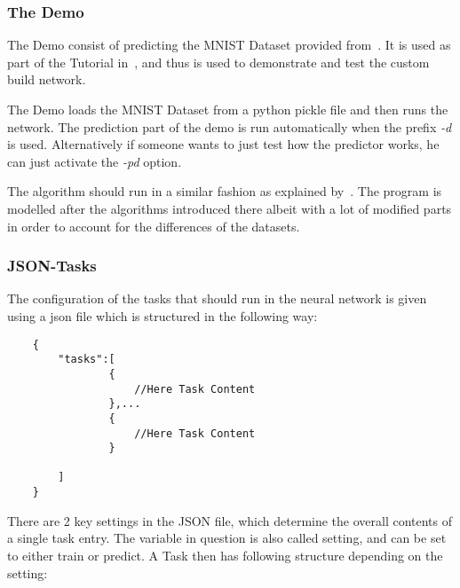 \documentclass[12pt]{article}
\begin{document}

\subsubsection{The Demo}
\label{subsub:demo}
The Demo consist of predicting the MNIST Dataset provided from~\cite{MNISTSite}. It is used as part of the Tutorial in~\cite{deepLearning.org}, and thus is used to demonstrate and test the custom build network. 

The Demo loads the MNIST Dataset from a python pickle file and then runs the network. The prediction part of the demo is run automatically when the prefix \emph{-d} is used. Alternatively if someone wants to just test how the predictor works, he can just activate the \emph{-pd} option.

The algorithm should run in a similar fashion as explained by~\cite{theanoTutorial}. The program is modelled after the algorithms introduced there albeit with a lot of modified parts in order to account for the differences of the datasets.

\subsubsection{JSON-Tasks}
\label{subsub:json}

The configuration of the tasks that should run in the neural network is given using a json file which is structured in the following way:
\begin{verbatim}
    {
        "tasks":[
                {
                    //Here Task Content    
                },...
                {
                    //Here Task Content 
                }
        
        ]
    }
\end{verbatim}

There are 2 key settings in the JSON file, which determine the overall contents of a single task entry. The variable in question is also called setting, and can be set to either train or predict. A Task then has following structure depending on the setting:
\end{document}
